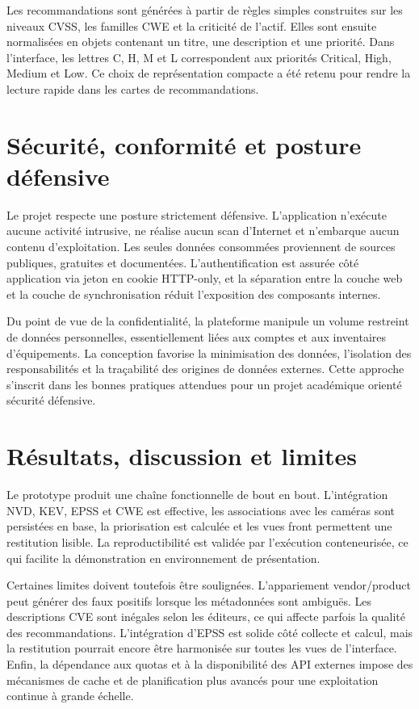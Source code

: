 \documentclass[12pt]{article}
\begin{document}
Les recommandations sont générées à partir de règles simples construites sur les niveaux CVSS, les familles CWE et la criticité de l'actif. Elles sont ensuite normalisées en objets contenant un titre, une description et une priorité. Dans l'interface, les lettres C, H, M et L correspondent aux priorités Critical, High, Medium et Low. Ce choix de représentation compacte a été retenu pour rendre la lecture rapide dans les cartes de recommandations.

\section{Sécurité, conformité et posture défensive}
Le projet respecte une posture strictement défensive. L'application n'exécute aucune activité intrusive, ne réalise aucun scan d'Internet et n'embarque aucun contenu d'exploitation. Les seules données consommées proviennent de sources publiques, gratuites et documentées. L'authentification est assurée côté application via jeton en cookie HTTP-only, et la séparation entre la couche web et la couche de synchronisation réduit l'exposition des composants internes.

Du point de vue de la confidentialité, la plateforme manipule un volume restreint de données personnelles, essentiellement liées aux comptes et aux inventaires d'équipements. La conception favorise la minimisation des données, l'isolation des responsabilités et la traçabilité des origines de données externes. Cette approche s'inscrit dans les bonnes pratiques attendues pour un projet académique orienté sécurité défensive.

\section{Résultats, discussion et limites}
Le prototype produit une chaîne fonctionnelle de bout en bout. L'intégration NVD, KEV, EPSS et CWE est effective, les associations avec les caméras sont persistées en base, la priorisation est calculée et les vues front permettent une restitution lisible. La reproductibilité est validée par l'exécution conteneurisée, ce qui facilite la démonstration en environnement de présentation.

Certaines limites doivent toutefois être soulignées. L'appariement vendor/product peut générer des faux positifs lorsque les métadonnées sont ambiguës. Les descriptions CVE sont inégales selon les éditeurs, ce qui affecte parfois la qualité des recommandations. L'intégration d'EPSS est solide côté collecte et calcul, mais la restitution pourrait encore être harmonisée sur toutes les vues de l'interface. Enfin, la dépendance aux quotas et à la disponibilité des API externes impose des mécanismes de cache et de planification plus avancés pour une exploitation continue à grande échelle.
\end{document}
